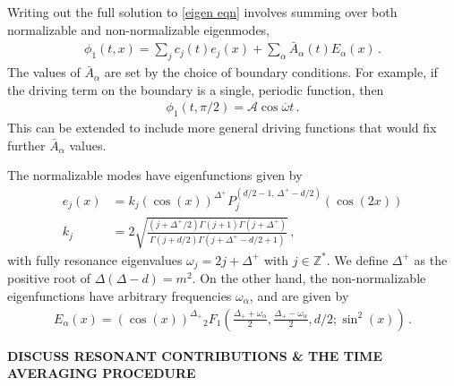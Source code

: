 \documentclass[letterpaper,11pt]{article}
\newcommand{\mc}{\mathcal}
\newcommand{\ob}{\overline{\omega}}
\begin{document}
Writing out the full solution to \eqref{eigen eqn} involves summing over both normalizable and non-normalizable eigenmodes,
\begin{align}
\label{phi1 gen}
\phi_1(t,x) = \sum_j c_j(t) e_j(x) + \sum_\alpha \bar A_\alpha (t) E_\alpha(x) \, .
\end{align}
The values of $\bar A_\alpha$ are set by the choice of boundary conditions. For example, if the driving term on the boundary is a single, periodic function, then
\begin{align}
\label{BC}
\phi_1(t,\pi/2) = \mc A \cos \ob t \, .
\end{align}
This can be extended to include more general driving functions that would fix further $\bar A_\alpha$ values.

The normalizable modes have eigenfunctions given by
\begin{align}
e_j(x) &= k_j \left( \cos(x) \right)^{\Delta^+} P_{j}^{(d/2 - 1, \, \Delta^+ - d/2)} \left( \cos (2x) \right) \\
k_j &= 2 \sqrt{\frac{(j + \Delta^+ /2) \Gamma(j+1) \Gamma(j+\Delta^+)}{\Gamma(j+d/2) \Gamma(j + \Delta^+ - d/2 + 1)}} \, ,
\end{align} 
with fully resonance eigenvalues $\omega_j = 2j + \Delta^+$ with $j \in \mathbb{Z}^*$. We define $\Delta^+$ as the positive root of $\Delta ( \Delta - d ) = m^2$. On the other hand, the non-normalizable eigenfunctions have arbitrary frequencies $\omega_\alpha$, and are given by
\begin{align}
\label{general basis}
E_\alpha (x) =  \left( \cos(x) \right)^{\Delta_+} {_2F_1} \left(\frac{\Delta_+ + \omega_\alpha}{2}, \frac{\Delta_+ - \omega_\alpha}{2}, d/2 ; \sin^2 (x) \right) \, .
\end{align}

\begin{center}
{\bf DISCUSS RESONANT CONTRIBUTIONS \& THE TIME AVERAGING PROCEDURE}
\end{center}
\end{document}
